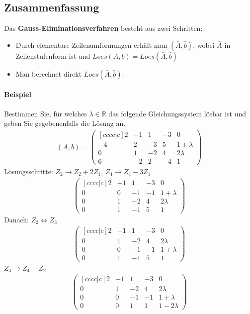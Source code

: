 \documentclass[11pt]{report}
\newcommand*\Zb[1] {\mathbb{#1}}
\newcommand*\f[1] {\textbf{#1}}
\begin{document}
\subsection{Zusammenfassung}
Das \f{Gauss-Eliminationsverfahren} besteht aus zwei Schritten:
\begin{itemize}
 \item Durch elementare Zeilenumformungen erhält man $(\bar{A}, \bar{b})$, wobei $\bar{A}$ in Zeilenstufenform ist und $Loes(A, b) = Loes(\bar{A}, \bar{b})$
 \item Man berechnet direkt $Loes(\bar{A}, \bar{b})$.
\end{itemize}

\paragraph{Beispiel}
Bestimmen Sie, für welches $\lambda \in \Zb{R}$ das folgende Gleichungssystem lösbar ist und geben Sie gegebenenfalls die Lösung an.
\begin{align}
(A, b) =
\begin{pmatrix}[cccc|c]
  2 & -1 & 1 & -3 & 0\\
  -4 & 2 & -3 & 5 & 1+\lambda \\
 0 & 1 & -2 & 4 & 2\lambda \\
 6 & -2 & 2 & -4 & 1
\end{pmatrix}
\end{align}
Lösungsschritte: $Z_2 \rightarrow Z_2 + 2Z_1$, $Z_4 \rightarrow Z_4 - 3 Z_1$
\begin{align}
\begin{pmatrix}[cccc|c]
  2 & -1 & 1 & -3 & 0\\
  0 & 0 & -1 & -1 & 1+\lambda \\
 0 & 1 & -2 & 4 & 2\lambda \\
 0 & 1 & -1 & 5 & 1
\end{pmatrix}
\end{align}
Danach: $Z_2 \Leftrightarrow Z_3$
\begin{align}
\begin{pmatrix}[cccc|c]
 2 & -1 & 1 & -3 & 0\\
 0 & 1 & -2 & 4 & 2\lambda \\
 0 & 0 & -1 & -1 & 1+\lambda \\
 0 & 1 & -1 & 5 & 1
\end{pmatrix}
\end{align}
$Z_4 \rightarrow Z_4-Z_2$
\begin{align}
\begin{pmatrix}[cccc|c]
 2 & -1 & 1 & -3 & 0\\
 0 & 1 & -2 & 4 & 2\lambda \\
 0 & 0 & -1 & -1 & 1+\lambda \\
 0 & 0 & 1 & 1 & 1-2\lambda
\end{pmatrix}
\end{align}
\end{document}
